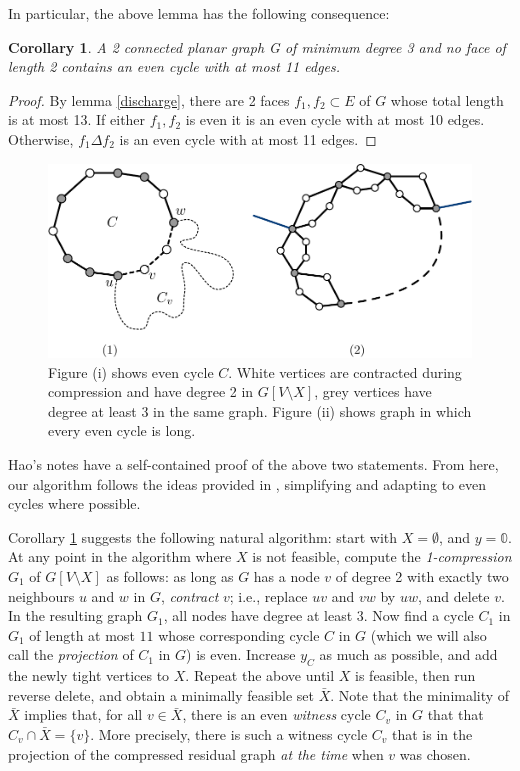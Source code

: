 \documentclass{article}
\newcommand{\0}{\mathbb{0}}
\newcommand{\1}{\mathbb{1}}
\newtheorem{cor}[theorem]{Corollary}
\begin{document}
In particular, the above lemma has the following consequence:

\begin{cor}\label{cor:smallec}
  A 2 connected planar graph G of minimum degree 3 and no face of
  length 2 contains an even cycle with at most 11 edges.
\end{cor}
\begin{proof}
By lemma \ref{discharge}, there are 2 faces $f_1,f_2 \subset E$ of $G$ whose total length is at most 13. If either $f_1,f_2$ is even it is an even cycle with at most 10 edges. Otherwise,  $f_1 \Delta f_2$ is an even cycle with at most 11 edges.
\end{proof}


\begin{figure}
  \begin{center}
    \includegraphics[width=.9\textwidth]{simple-pd.pdf}
  \end{center}
  \caption{\label{fig:simplepd} Figure (i) shows even cycle
    $C$. White vertices are contracted during compression and have
    degree 2 in $G[V\setminus X]$, grey vertices have degree at least
    3 in the same graph. Figure (ii) shows graph in which every even cycle is long. }
\end{figure}

Hao's notes have a self-contained proof of the above two statements.
From here, our algorithm follows the ideas provided in \cite{FJP10},
simplifying and adapting to even cycles where possible. 

Corollary \ref{cor:smallec} suggests the following natural algorithm:
start with $X=\emptyset$, and $y=\0$. At any point in the algorithm
where $X$ is not feasible, compute the {\em 1-compression} $G_1$ of
$G[V\setminus X]$ as follows: as long as $G$ has a node $v$ of degree 2 with
exactly two neighbours $u$ and $w$ in $G$, {\em contract} $v$; i.e.,
replace $uv$ and $vw$ by $uw$, and delete $v$. In the resulting graph
$G_1$, all nodes have degree at least $3$. Now find a cycle $C_1$ in
$G_1$ of length at most $11$ whose corresponding cycle $C$ in $G$
(which we will also call the {\em projection} of $C_1$ in $G$)
is
even. Increase $y_C$ as much as possible, and add the newly tight
vertices to $X$. Repeat the above until $X$ is feasible, then run
reverse delete, and obtain a minimally feasible set $\bar{X}$. Note
that the minimality of $\bar{X}$ implies that, for all
$v \in \bar{X}$, there is an even {\em witness} cycle $C_v$ in $G$
that that $C_v \cap \bar{X} = \{v\}$. More precisely,  there is such a
witness cycle $C_v$ that is in the projection of  the compressed
residual graph {\em at the time} when $v$ was chosen. 
\end{document}
